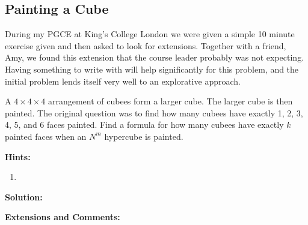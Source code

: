 \subsection{Painting a Cube}

During my PGCE at King's College London we were given a simple 10 minute exercise given and then asked to look for extensions. Together with a friend, Amy, we found this extension that the course leader probably was not expecting. Having something to write with will help significantly for this problem, and the initial problem lends itself very well to an explorative approach.

A $4 \times 4 \times 4$ arrangement of cubees form a larger cube. The larger cube is then painted. The original question was to find how many cubees have exactly 1, 2, 3, 4, 5, and 6 faces painted. Find a formula for how many cubees have exactly $k$ painted faces when an $N^m$ hypercube is painted.

\textbf{Hints:}

\begin{enumerate}
    \item 
\end{enumerate}

\textbf{Solution:}



\textbf{Extensions and Comments:}



